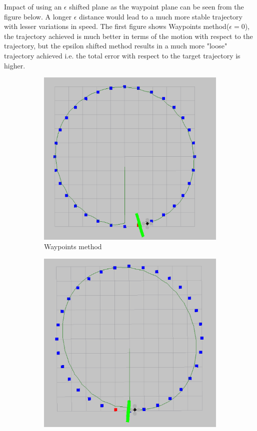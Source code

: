 \documentclass[hidelinks,BTech]{iitmdiss}
\begin{document}
Impact of using an $\epsilon$ shifted plane as the waypoint plane can be seen from the figure below. A longer $\epsilon$ distance would lead to a much more stable trajectory with lesser variations in speed. The first figure shows Waypoints method($\epsilon=0$), the trajectory achieved is much better in terms of the motion with respect to the trajectory, but the epsilon shifted method results in a much more "loose" trajectory achieved i.e. the total error with respect to the target trajectory is higher. 

\begin{figure}[H]
  \centering
  \begin{subfigure}[t]{0.45\textwidth}
    \centering
      \includegraphics[width=\textwidth]{Waypoints.png}
      \caption{Waypoints method}
  \end{subfigure}
  \begin{subfigure}[t]{0.45\textwidth}
    \centering
      \includegraphics[width=\textwidth]{Waypoints_0_9.png}

\end{subfigure}
\end{figure}
\end{document}
